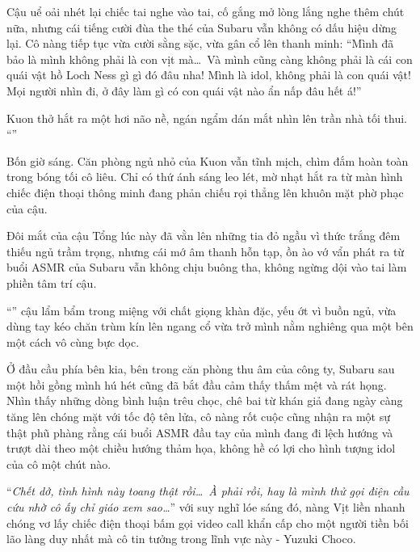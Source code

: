 \documentclass[../main.tex]{subfiles}
\begin{document}
Cậu uể oải nhét lại chiếc tai nghe vào tai, cố gắng mở lòng lắng nghe thêm chút nữa, nhưng cái tiếng cười đùa the thé của Subaru vẫn không có dấu hiệu dừng lại. Cô nàng tiếp tục vừa cười sằng sặc, vừa gân cổ lên thanh minh: ``Mình đã bảo là mình không phải là con vịt mà\dots\ Và mình cũng càng không phải là cái con quái vật hồ Loch Ness gì gì đó đâu nha! Mình là idol, không phải là con quái vật! Mọi người nhìn đi, ở đây làm gì có con quái vật nào ẩn nấp đâu hết á!''

Kuon thở hắt ra một hơi não nề, ngán ngẩm dán mắt nhìn lên trần nhà tối thui. ``\textit{}''

\ct

Bốn giờ sáng. Căn phòng ngủ nhỏ của Kuon vẫn tĩnh mịch, chìm đắm hoàn toàn trong bóng tối cô liêu. Chỉ có thứ ánh sáng leo lét, mờ nhạt hắt ra từ màn hình chiếc điện thoại thông minh đang phản chiếu rọi thẳng lên khuôn mặt phờ phạc của cậu.

Đôi mắt của cậu Tổng lúc này đã vằn lên những tia đỏ ngầu vì thức trắng đêm thiếu ngủ trầm trọng, nhưng cái mớ âm thanh hỗn tạp, ồn ào vớ vẩn phát ra từ buổi ASMR của Subaru vẫn không chịu buông tha, không ngừng dội vào tai làm phiền tâm trí cậu.

``'' cậu lẩm bẩm trong miệng với chất giọng khàn đặc, yếu ớt vì buồn ngủ, vừa dùng tay kéo chăn trùm kín lên ngang cổ vừa trở mình nằm nghiêng qua một bên một cách vô cùng bực dọc.

\il

Ở đầu cầu phía bên kia, bên trong căn phòng thu âm của công ty, Subaru sau một hồi gồng mình hú hét cũng đã bắt đầu cảm thấy thấm mệt và rát họng. Nhìn thấy những dòng bình luận trêu chọc, chê bai từ khán giả đang ngày càng tăng lên chóng mặt với tốc độ tên lửa, cô nàng rốt cuộc cũng nhận ra một sự thật phũ phàng rằng cái buổi ASMR đầu tay của mình đang đi lệch hướng và trượt dài theo một chiều hướng thảm họa, không hề có lợi cho hình tượng idol của cô một chút nào.

``\textit{Chết dở, tình hình này toang thật rồi\dots\ À phải rồi, hay là mình thử gọi điện cầu cứu nhờ cô ấy chỉ giáo xem sao\dots}'' với suy nghĩ lóe sáng đó, nàng Vịt liền nhanh chóng vơ lấy chiếc điện thoại bấm gọi video call khẩn cấp cho một người tiền bối lão làng duy nhất mà cô tin tưởng trong lĩnh vực này - Yuzuki Choco.
\end{document}
